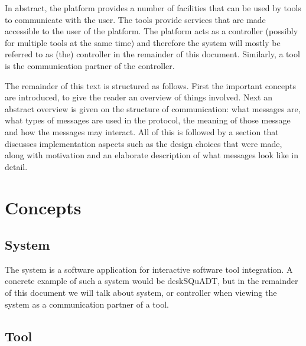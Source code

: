 \documentclass{article}
\begin{document}
  In abstract, the platform provides a number of facilities that can be used by
  tools to communicate with the user. The tools provide services that are made
  accessible to the user of the platform. The platform acts as a controller
  (possibly for multiple tools at the same time) and therefore the system will
  mostly be referred to as (the) controller in the remainder of this document.
  Similarly, a tool is the communication partner of the controller.

  The remainder of this text is structured as follows. First the important
  concepts are introduced, to give the reader an overview of things involved.
  Next an abstract overview is given on the structure of communication: what
  messages are, what types of messages are used in the protocol, the meaning of
  those message and how the messages may interact. All of this is followed by a
  section that discusses implementation aspects such as the design choices that
  were made, along with motivation and an elaborate description of what
  messages look like in detail.

 \pagebreak

 \section{Concepts}

  \subsection{System}

   The system is a software application for interactive software tool
   integration. A concrete example of such a system would be deskSQuADT, but in
   the remainder of this document we will talk about system, or controller when
   viewing the system as a communication partner of a tool.

   
   
  \subsection{Tool}
\end{document}
